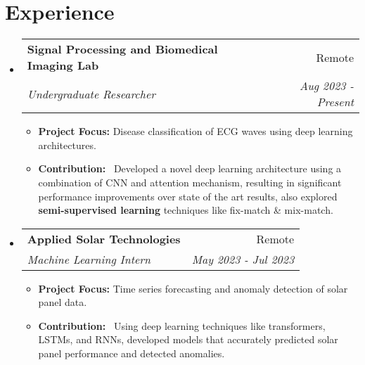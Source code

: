 \documentclass[a4paper,20pt]{article}
\makeatletter
\newcommand{\resumeSubheading}[4]{
  \vspace{-1pt}\item
    \begin{tabular*}{0.97\textwidth}{l@{\extracolsep{\fill}}r}
      \textbf{#1} & #2 \\
      \textit{#3} & \textit{#4} \\
    \end{tabular*}\vspace{-5pt}
}
\newcommand{\resumeSubHeadingListStart}{\begin{itemize}[leftmargin=*]}
\newcommand{\resumeSubHeadingListEnd}{\end{itemize}}
\makeatother
\begin{document}
\vspace{3pt}
\section{Experience}
  \resumeSubHeadingListStart
    \resumeSubheading{Signal Processing and Biomedical Imaging Lab}{Remote}
        {Undergraduate Researcher}{Aug 2023 - Present}
    \begin{itemize}
    \item {\textbf{Project Focus: }Disease classification of ECG waves using deep learning architectures.}
    \item {\textbf{Contribution: }~Developed a novel deep learning architecture using a combination of CNN and attention mechanism, resulting in significant performance improvements over state of the art results, also explored \textbf{semi-supervised learning} techniques like fix-match \& mix-match.}
    \end{itemize}

\vspace{-5pt}
    \resumeSubheading{Applied Solar Technologies}{Remote}
    {Machine Learning Intern}{May 2023 - Jul 2023}
    \begin{itemize}
    \item {\textbf{Project Focus: }Time series forecasting and anomaly detection of solar panel data.}
    \item {\textbf{Contribution: }~Using deep learning techniques like transformers, LSTMs, and RNNs, developed models that accurately predicted solar panel performance and detected anomalies.}
    \end{itemize}

\resumeSubHeadingListEnd

\vspace{3pt}
\end{document}
